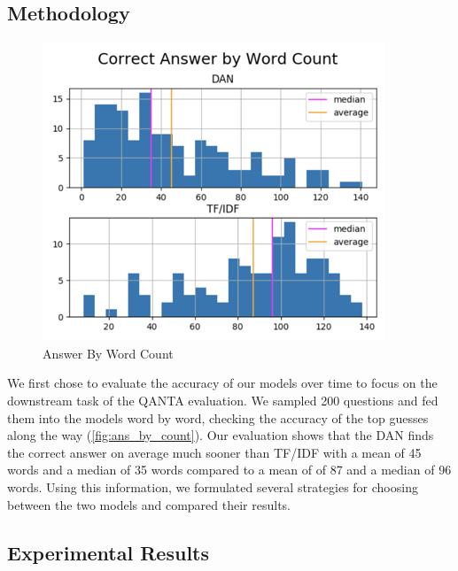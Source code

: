 \documentclass[11pt,a4paper]{article}
\begin{document}
\subsection{Methodology}

\begin{figure}[ht]
  \includegraphics[width=\columnwidth]{assets/answer-word-count.png}
  \caption{Answer By Word Count}
  \label{fig:ans_by_count}
\end{figure}

We first chose to evaluate the accuracy of our models over time to focus on the downstream task of the \textsc{QANTA} evaluation.  We sampled 200 questions and fed them into the models word by word, checking the accuracy of the top guesses along the way (\autoref{fig:ans_by_count}).  Our evaluation shows that the \textsc{DAN} finds the correct answer on average much sooner than \textsc{TF/IDF} with a mean of 45 words and a median of 35  words compared to a mean of of 87 and a median of 96 words.  Using this information, we formulated several strategies for choosing between the two models and compared their results.

\subsection{Experimental Results}
\end{document}
